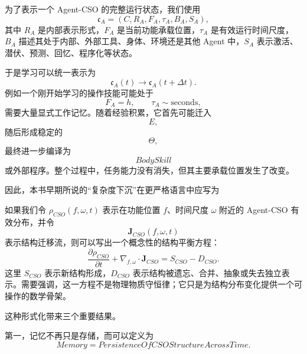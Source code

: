 为了表示一个 Agent-CSO 的完整运行状态，我们使用
\begin{equation}
\mathfrak{c}_{A}
=
(C,R_A,F_A,\tau_A,B_A,S_A),
\end{equation}
其中 $R_A$ 是内部表示形式，$F_A$ 是当前功能承载位置，$\tau_A$ 是有效运行时间尺度，$B_A$ 描述其处于内部、外部工具、身体、环境还是其他 Agent 中，$S_A$ 表示激活、潜伏、预测、回忆、程序化等状态。

于是学习可以统一表示为
\begin{equation}
\boxed{
\mathfrak{c}_{A}(t)
\rightarrow
\mathfrak{c}_{A}(t+\Delta t).
}
\end{equation}
例如一个刚开始学习的操作技能可能处于
\begin{equation}
F_A=h,\qquad
\tau_A\sim\mathrm{seconds},
\end{equation}
需要大量显式工作记忆。随着经验积累，它首先可能迁入
\begin{equation}
E,
\end{equation}
随后形成稳定的
\begin{equation}
\Theta,
\end{equation}
最终进一步编译为
\begin{equation}
BodySkill
\end{equation}
或外部程序。整个过程中，任务能力没有消失，但其主要承载位置发生了改变。

因此，本书早期所说的“复杂度下沉”在更严格语言中应写为
\begin{statementbox}
\centering
{}
\end{statementbox}

如果我们令 $\rho_{CSO}(f,\omega,t)$ 表示在功能位置 $f$、时间尺度 $\omega$ 附近的 Agent-CSO 有效分布，并令
\begin{equation}
\mathbf{J}_{CSO}(f,\omega,t)
\end{equation}
表示结构迁移流，则可以写出一个概念性的结构平衡方程：
\begin{equation}
\frac{\partial \rho_{CSO}}{\partial t}
+
\nabla_{f,\omega}\cdot
\mathbf{J}_{CSO}
=
S_{CSO}
-
D_{CSO}.
\end{equation}
这里 $S_{CSO}$ 表示新结构形成，$D_{CSO}$ 表示结构被遗忘、合并、抽象或失去独立表示。需要强调，这一方程不是物理物质守恒律；它只是为结构分布变化提供一个可操作的数学骨架。

这种形式化带来三个重要结果。

第一，记忆不再只是存储，而可以定义为
\begin{equation}
\boxed{
Memory
=
PersistenceOfCSOStructureAcrossTime.
}
\end{equation}

